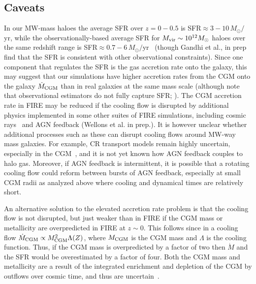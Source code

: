 \documentclass[fleqn,usenatbib]{mnras}
\newcommand{\Mdot}{\dot{M}}
\begin{document}
\subsection{Caveats}
\label{s: caveats}


In our MW-mass haloes the average SFR over $z=0-0.5$ is SFR$\approx 3-10\,M_\odot/$yr, while the observationally-based average SFR for $M_{\rm vir} \sim 10^{12} M_\odot$ haloes over the same redshift range is SFR$\approx 0.7-6\,M_\odot/$yr~\citep{Behroozi2013} (though Gandhi et al., in prep find that the SFR is consistent with other observational constraints).
Since one component that regulates the SFR is the gas accretion rate onto the galaxy, this may suggest that our simulations have higher accretion rates from the CGM onto the galaxy $\Mdot_{\rm CGM}$ than in real galaxies at the same mass scale (although note that observational estimators do not fully capture SFR; \citealt{FloresVelazquez2021}).
The CGM accretion rate in FIRE may be reduced if the cooling flow is disrupted by additional physics implemented in some other suites of FIRE simulations, including cosmic rays~\citep{Chan2019, Hopkins2020a, Hopkins2021e, Hopkins2021d} and AGN feedback (Wellons et al. in prep.).
It is however unclear whether additional processes such as these can disrupt cooling flows around MW-way mass galaxies.
For example, CR transport models remain highly uncertain, especially in the CGM~\citep{Hopkins2021, Quataert2021, Quataert2021a}, and it is not yet known how AGN feedback couples to halo gas.
Moreover, if AGN feedback is intermittent, it is possible that a rotating cooling flow could reform between bursts of AGN feedback, especially at small CGM radii as analyzed above where cooling and dynamical times are relatively short. 

An alternative solution to the elevated accretion rate problem is that the cooling flow is not disrupted, but just weaker than in FIRE if the CGM mass or metallicity are overpredicted in FIRE at $z\sim0$.
This follows since in a cooling flow $\Mdot_{\rm CGM}\propto M_{\rm CGM}^2 \Lambda(Z)$, where $M_{\rm CGM}$ is the CGM mass and $\Lambda$ is the cooling function.
Thus, if the CGM mass is overpredicted by a factor of two then $\Mdot$ and the SFR would be overestimated by a factor of four.
Both the CGM mass and metallicity are a result of the integrated enrichment and depletion of the CGM by outflows over cosmic time, and thus are uncertain~\citep[e.g.,][]{Davies2021, Kelly2021}.
\end{document}
